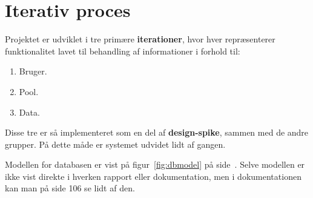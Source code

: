 \section{Iterativ proces}


Projektet er udviklet i tre primære \textbf{iterationer}, hvor hver repræsenterer funktionalitet lavet til behandling af informationer i forhold til:

\begin{enumerate}
	\item Bruger.
	\item Pool.
	\item Data.
\end{enumerate}

Disse tre er så implementeret som en del af \textbf{design-spike}, sammen med de andre grupper. På dette måde er systemet udvidet lidt af gangen. 

Modellen for databasen er vist på figur~\ref{fig:dbmodel} på side~\pageref{fig:dbmodel}. Selve modellen er ikke vist direkte i hverken rapport eller dokumentation, men i dokumentationen kan man på side 106 se lidt af den.

